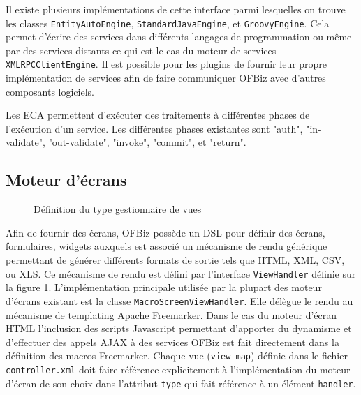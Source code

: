 \documentclass[a4paper, 11pt]{report}
\begin{document}
Il existe plusieurs implémentations de cette interface parmi
lesquelles on trouve les classes \texttt{EntityAutoEngine},
\texttt{StandardJavaEngine}, et \texttt{GroovyEngine}. Cela permet
d'écrire des services dans différents langages de programmation ou
même par des services distants ce qui est le cas du moteur de services
\verb=XMLRPCClientEngine=. Il est possible pour les plugins de fournir
leur propre implémentation de services afin de faire communiquer OFBiz
avec d'autres composants logiciels.

Les ECA permettent d'exécuter des traitements à différentes phases de
l'exécution d'un service. Les différentes phases existantes sont
"auth", "in-validate", "out-validate", "invoke", "commit", et
"return".

\subsection{Moteur d'écrans}

\begin{figure}
  \centering
  \caption{Définition du type gestionnaire de vues}
  \label{fig:viewhandler}
\end{figure}

Afin de fournir des écrans, OFBiz possède un DSL pour définir des
écrans, formulaires, widgets auxquels est associé un mécanisme de
rendu générique permettant de générer différents formats de sortie
tels que HTML, XML, CSV, ou XLS. Ce mécanisme de rendu est défini par
l'interface \verb=ViewHandler= définie sur la figure
\ref{fig:viewhandler}. L'implémentation principale utilisée par la
plupart des moteur d'écrans existant est la classe
\verb=MacroScreenViewHandler=. Elle délègue le rendu au mécanisme de
templating Apache Freemarker. Dans le cas du moteur d'écran HTML
l'inclusion des scripts Javascript permettant d'apporter du dynamisme
et d'effectuer des appels AJAX \cite{garrett2005ajax} à des services
OFBiz est fait directement dans la définition des macros Freemarker.
Chaque vue (\verb=view-map=) définie dans le fichier
\verb=controller.xml= doit faire référence explicitement à
l'implémentation du moteur d'écran de son choix dans l'attribut
\verb=type= qui fait référence à un élément \verb=handler=.
\end{document}
